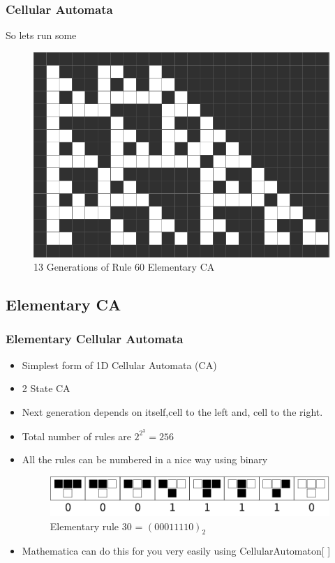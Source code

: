 \documentclass{beamer}
\begin{document}
\begin{frame}
    \frametitle{Cellular Automata}
    So lets run some 
    \begin{figure}
        \includegraphics[scale=0.4]{fig3.png}
        \caption{13 Generations of Rule 60 Elementary CA}
    \end{figure}
\end{frame}
\subsection{Elementary CA}
\begin{frame}
    \frametitle{Elementary Cellular Automata}
    \begin{itemize}
        \item Simplest form of 1D Cellular Automata (CA)
        \item 2 State CA
        \item Next generation depends on itself,cell to the left and, cell to the right.
        \item Total number of rules are $2^{2^3} = 256$
        \item All the rules can be numbered in a nice way using binary
        \begin{figure}[H]
            \includegraphics[scale=0.5]{fig1.png}
            \caption{Elementary rule 30 = $(00011110)_2$}
        \end{figure}
        \item Mathematica can do this for you very easily using CellularAutomaton[ ]
    \end{itemize}
\end{frame}
\end{document}
